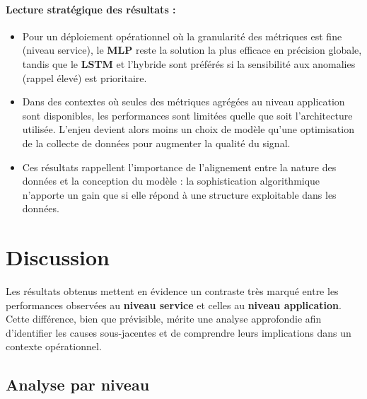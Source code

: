 \documentclass[a4paper,12pt]{report}
\begin{document}
\paragraph{Lecture stratégique des résultats :}
\begin{itemize}
    \item Pour un déploiement opérationnel où la granularité des métriques est fine (niveau service), le \textbf{MLP} reste la solution la plus efficace en précision globale, tandis que le \textbf{LSTM} et l’hybride sont préférés si la sensibilité aux anomalies (rappel élevé) est prioritaire.
    \item Dans des contextes où seules des métriques agrégées au niveau application sont disponibles, les performances sont limitées quelle que soit l’architecture utilisée. L’enjeu devient alors moins un choix de modèle qu’une optimisation de la collecte de données pour augmenter la qualité du signal.
    \item Ces résultats rappellent l’importance de l’alignement entre la nature des données et la conception du modèle : la sophistication algorithmique n’apporte un gain que si elle répond à une structure exploitable dans les données.
\end{itemize}



\section{Discussion}

Les résultats obtenus mettent en évidence un contraste très marqué entre les performances observées au \textbf{niveau service} et celles au \textbf{niveau application}. Cette différence, bien que prévisible, mérite une analyse approfondie afin d’identifier les causes sous-jacentes et de comprendre leurs implications dans un contexte opérationnel.

\subsection*{Analyse par niveau}
\end{document}
